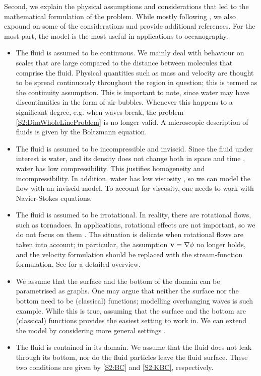 \documentclass[11pt,reqno,oneside,a4paper]{article}
\begin{document}
Second, we explain the physical assumptions and considerations that led to the mathematical formulation of the problem. While mostly following \cite[Chapter 1]{Lannes}, we also expound on some of the considerations and provide additional references. For the most part, the model is the most useful in applications to oceanography.
\begin{itemize}
\item The fluid is assumed to be continuous. We mainly deal with behaviour on scales that are large compared to the distance between molecules that comprise the fluid. Physical quantities such as mass and velocity are thought to be spread continuously throughout the region in question; this is termed as the continuity assumption. This is important to note, since water may have discontinuities in the form of air bubbles. Whenever this happens to a significant degree, e.g. when waves break, the problem \eqref{S2:DimWholeLineProblem} is no longer valid. A microscopic description of fluids is given by the Boltzmann equation. 
\item The fluid is assumed to be incompressible and inviscid. Since the fluid under interest is water, and its density does not change both in space and time \cite{}, water has low compressibility. This justifies homogeneity and incompressibility. In addition, water has low viscosity \cite{}, so we can model the flow with an inviscid model. To account for viscosity, one needs to work with Navier-Stokes equations. 
\item The fluid is assumed to be irrotational. In reality, there are rotational flows, such as tornadoes. In applications, rotational effects are not important, so we do not focus on them \cite{}. The situation is delicate when rotational flows are taken into account; in particular, the assumption ${\bf v} = \nabla \phi$ no longer holds, and the velocity formulation should be replaced with the stream-function formulation. See \cite[p.32]{Lannes} for a detailed overview.
\item We assume that the surface and the bottom of the domain can be parametrised as graphs. One may argue that neither the surface nor the bottom need to be (classical) functions; modelling overhanging waves is such example. While this is true, assuming that the surface and the bottom are (classical) functions provides the easiest setting to work in. We can extend the model by considering more general settings \cite{}.
\item The fluid is contained in its domain. We assume that the fluid does not leak through its bottom, nor do the fluid particles leave the fluid surface. These two conditions are given by \eqref{S2:BC} and \eqref{S2:KBC}, respectively.

\end{itemize}
\end{document}
